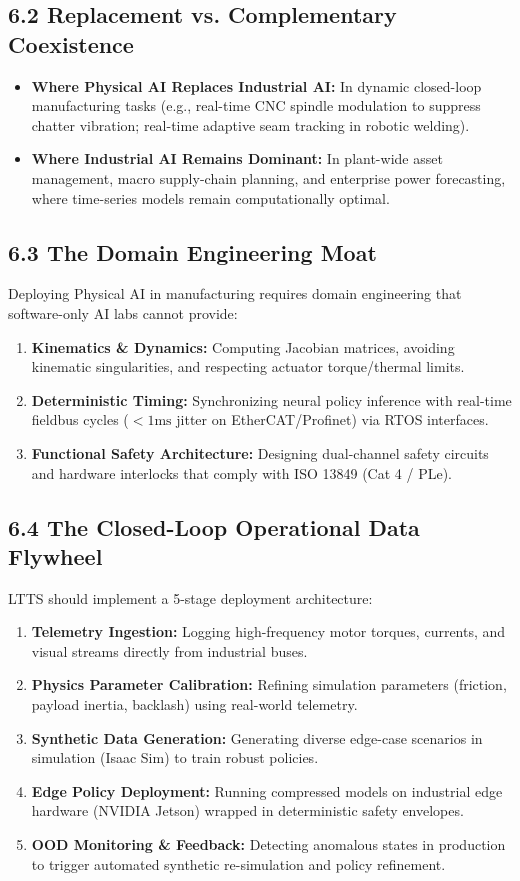 \documentclass[11pt,a4paper]{article}
\begin{document}
\subsection{6.2 Replacement vs. Complementary Coexistence}
\begin{itemize}
    \item \textbf{Where Physical AI Replaces Industrial AI:} In dynamic closed-loop manufacturing tasks (e.g., real-time CNC spindle modulation to suppress chatter vibration; real-time adaptive seam tracking in robotic welding).
    \item \textbf{Where Industrial AI Remains Dominant:} In plant-wide asset management, macro supply-chain planning, and enterprise power forecasting, where time-series models remain computationally optimal.
\end{itemize}

\subsection{6.3 The Domain Engineering Moat}
Deploying Physical AI in manufacturing requires domain engineering that software-only AI labs cannot provide:
\begin{enumerate}
    \item \textbf{Kinematics \& Dynamics:} Computing Jacobian matrices, avoiding kinematic singularities, and respecting actuator torque/thermal limits.
    \item \textbf{Deterministic Timing:} Synchronizing neural policy inference with real-time fieldbus cycles ($<1\text{ms}$ jitter on EtherCAT/Profinet) via RTOS interfaces.
    \item \textbf{Functional Safety Architecture:} Designing dual-channel safety circuits and hardware interlocks that comply with ISO 13849 (Cat 4 / PLe).
\end{enumerate}

\subsection{6.4 The Closed-Loop Operational Data Flywheel}
LTTS should implement a 5-stage deployment architecture:
\begin{enumerate}
    \item \textbf{Telemetry Ingestion:} Logging high-frequency motor torques, currents, and visual streams directly from industrial buses.
    \item \textbf{Physics Parameter Calibration:} Refining simulation parameters (friction, payload inertia, backlash) using real-world telemetry.
    \item \textbf{Synthetic Data Generation:} Generating diverse edge-case scenarios in simulation (Isaac Sim) to train robust policies.
    \item \textbf{Edge Policy Deployment:} Running compressed models on industrial edge hardware (NVIDIA Jetson) wrapped in deterministic safety envelopes.
    \item \textbf{OOD Monitoring \& Feedback:} Detecting anomalous states in production to trigger automated synthetic re-simulation and policy refinement.
\end{enumerate}
\end{document}
